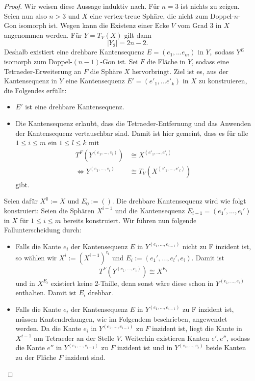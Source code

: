 \documentclass[12pt,titlepage,twoside,cleardoublepage]{article}
\theoremstyle{nummermitklammern}
\numberwithin{equation}{section}
\begin{document}
\begin{proof}
Wir weisen diese Aussage induktiv nach. Für $n=3$ ist nichts zu zeigen. Seien nun also $n>3$ und $X$ eine vertex-treue Sphäre, die nicht zum Doppel-$n$-Gon isomorph ist. 
Wegen  kann die Existenz einer Ecke $V$ vom Grad 3 in $X$ angenommen werden. Für $Y=T_V(X)$ gilt dann 
\[
\vert Y_2\vert=2n-2.
\]
Deshalb existiert eine drehbare Kantensequenz $E=(e_1,\ldots e_m)$ in $Y,$ sodass $Y^E$ isomorph zum Doppel-$(n-1)$-Gon ist. Sei $F$ die Fläche in $Y$, sodass eine Tetraeder-Erweiterung an $F$ die Sphäre $X$ hervorbringt. Ziel ist es, aus der Kantensequenz in $Y$ eine Kantensequenz $E'=(e'_1,\ldots e'_k)$ in $X$ zu konstruieren, die Folgendes erfüllt:
\begin{itemize}
\item $E'$ ist eine drehbare Kantensequenz.
\item Die Kantensequenz erlaubt, dass die Tetraeder-Entfernung und das Anwenden der Kantensequenz vertauschbar sind. Damit ist hier gemeint, dass es für alle $1\leq i\leq m$ ein $1\leq l \leq k$ mit 
\begin{align*}
T^F(Y^{(e_1,\ldots, e_i)})&\cong X^{(e'_1,\ldots,e'_l)} \\
\Leftrightarrow Y^{(e_1,\ldots, e_i)}&\cong T_V(X^{(e'_1,\ldots,e'_l)})
\end{align*} 
gibt.
\end{itemize}
Seien dafür $X^0:=X$ und $E_0:=().$ Die drehbare Kantensequenz wird wie folgt konstruiert: Seien die Sphären $X^{i-1}$ und die Kantensequenz $E_{i-1}=(e_1',\ldots,e_l')$ in $X$ für $1\leq i \leq m$ bereits konstruiert. Wir führen nun folgende Fallunterscheidung durch:
\begin{itemize}
\item Falls die Kante $e_{i}$ der Kantensequenz $E$ in $Y^{(e_1,\ldots,e_{i-1})}$ nicht zu F inzident ist, so wählen wir $X^{i}:={(X^{i-1})}^{e_i}$ und $E_{i}:=(e_1',\ldots,e_l',e_i)$. Damit ist 
\[
T^F(Y^{(e_1,\ldots,e_i)})\cong X^{E_{i}}
\]
und in $X^{E_{i}}$ existiert keine 2-Taille, denn sonst wäre diese schon in $Y^{(e_1,\ldots,e_i)}$ enthalten. Damit ist $E_{i}$ drehbar.
\item Falls die Kante $e_i$ der Kantensequenz $E$ in $Y^{(e_1,\ldots,e_{i-1})}$ zu F inzident ist, müssen Kantendrehungen, wie im Folgendem beschrieben, angewendet werden. Da die Kante $e_i$ in $Y^{(e_1,\ldots,e_{i-1})}$ zu $F$ inzident ist, liegt die Kante in $X^{i-1}$ am Tetraeder an der Stelle $V.$
Weiterhin existieren Kanten $e',e''$, sodass die Kante $e''$ in $Y^{(e_1,\ldots,e_{i-1})}$ zu $F$ inzident ist und in $Y^{(e_1,\ldots,e_{i})}$ beide Kanten zu der Fläche $F$ inzident sind.

\end{itemize}
\end{proof}
\end{document}
